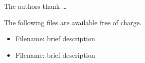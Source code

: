 \documentclass[journal=jprobs,manuscript=article]{achemso}
\begin{document}
\begin{acknowledgement}

The authors thank \ldots
\end{acknowledgement}

\begin{suppinfo}

The following files are available free of charge.
\begin{itemize}
  \item Filename: brief description
  \item Filename: brief description
\end{itemize}

\end{suppinfo}

\newpage


\end{document}
